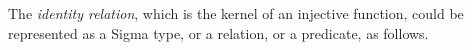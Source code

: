 The \textit{identity relation}, which is the kernel of an injective function, could be represented as a Sigma type, or a relation, or a predicate, as follows.
\ccpad
\begin{code}%
\>[1]\AgdaSpace{}%
\AgdaSymbol{:}\AgdaSpace{}%
\AgdaSymbol{\{}\AgdaSpace{}%
\AgdaSymbol{:}\AgdaSpace{}%
%
\AgdaSpace{}%
\AgdaSymbol{\}}\AgdaSpace{}%
\AgdaSpace{}%
%
\<%
\\
%
\>[1]\AgdaSpace{}%
\AgdaSymbol{\{}\AgdaSymbol{\}}\AgdaSpace{}%
\AgdaSymbol{=}\AgdaSpace{}%
\AgdaSpace{}%
\AgdaSpace{}%
\AgdaSpace{}%
\AgdaSpace{}%
\AgdaFunction{,}\AgdaSpace{}%
\AgdaSpace{}%
\AgdaSpace{}%
\AgdaSpace{}%
\AgdaSpace{}%
\AgdaFunction{,}\AgdaSpace{}%
\AgdaSpace{}%
\AgdaSpace{}%
\<%
\\
%
\\[\AgdaEmptyExtraSkip]%
%
\>[1]\AgdaSpace{}%
\AgdaSymbol{:}\AgdaSpace{}%
\AgdaSymbol{\{}\AgdaSpace{}%
\AgdaSymbol{:}\AgdaSpace{}%
%
\AgdaSpace{}%
\AgdaSymbol{\}}\AgdaSpace{}%
\AgdaSpace{}%
\AgdaSpace{}%
\AgdaSpace{}%
\<%
\\
%
\>[1]\AgdaSpace{}%
\AgdaSpace{}%
\AgdaSpace{}%
\AgdaSymbol{=}\AgdaSpace{}%
\AgdaSpace{}%
\AgdaSpace{}%
\<%
\\
%
\\[\AgdaEmptyExtraSkip]%
%
\>[1]\AgdaSpace{}%
\AgdaSymbol{:}\AgdaSpace{}%
\AgdaSymbol{\{}\AgdaSpace{}%
\AgdaSymbol{:}\AgdaSpace{}%
%
\AgdaSpace{}%
\AgdaSymbol{\}}\AgdaSpace{}%
\AgdaSpace{}%
\AgdaSpace{}%
\AgdaSymbol{(}\AgdaSpace{}%
\AgdaSpace{}%
\AgdaSymbol{)}\AgdaSpace{}%
\<%
\\
%
\>[1]\AgdaSpace{}%
\AgdaSymbol{(}\AgdaSpace{}%
\AgdaOperator{\AgdaInductiveConstructor{,}}\AgdaSpace{}%
\AgdaSymbol{)}\AgdaSpace{}%
\AgdaSymbol{=}\AgdaSpace{}%
\AgdaSpace{}%
\AgdaSpace{}%
\<%
\end{code}

